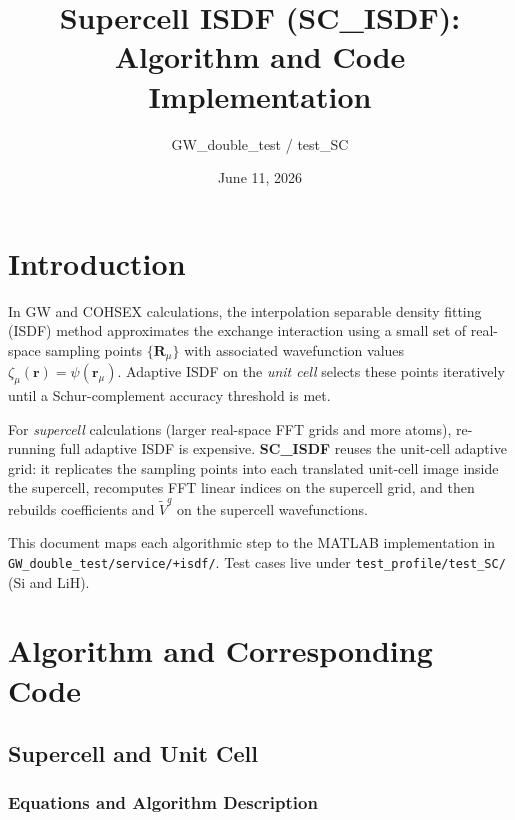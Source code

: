 \documentclass[11pt,a4paper]{article}
\title{Supercell ISDF (SC\_ISDF): Algorithm and Code Implementation}
\author{GW\_double\_test / test\_SC}
\date{June 11, 2026}
\begin{document}
\maketitle

\section{Introduction}

In GW and COHSEX calculations, the interpolation separable density fitting (ISDF)
method approximates the exchange interaction using a small set of real-space
sampling points $\{\mathbf R_\mu\}$ with associated wavefunction values
$\zeta_\mu(\mathbf r) = \psi(\mathbf r_\mu)$.
Adaptive ISDF on the \emph{unit cell} selects these points iteratively until a
Schur-complement accuracy threshold is met.

For \emph{supercell} calculations (larger real-space FFT grids and more atoms),
re-running full adaptive ISDF is expensive.
\textbf{SC\_ISDF} reuses the unit-cell adaptive grid: it replicates the sampling
points into each translated unit-cell image inside the supercell, recomputes FFT
linear indices on the supercell grid, and then rebuilds coefficients and
$\tilde V^q$ on the supercell wavefunctions.

This document maps each algorithmic step to the MATLAB implementation in
\texttt{GW\_double\_test/service/+isdf/}.
Test cases live under \texttt{test\_profile/test\_SC/} (Si and LiH).

\section{Algorithm and Corresponding Code}

\subsection{Supercell and Unit Cell}

\subsubsection{Equations and Algorithm Description}
\end{document}
